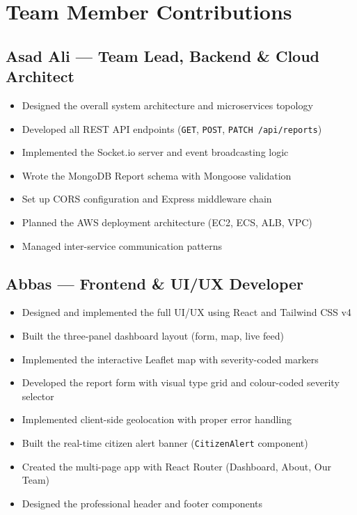 \documentclass[12pt, a4paper]{report}
\begin{document}
\section{Team Member Contributions}

\subsection{Asad Ali --- Team Lead, Backend \& Cloud Architect}

\begin{itemize}
  \item Designed the overall system architecture and microservices topology
  \item Developed all REST API endpoints (\texttt{GET}, \texttt{POST}, \texttt{PATCH /api/reports})
  \item Implemented the Socket.io server and event broadcasting logic
  \item Wrote the MongoDB Report schema with Mongoose validation
  \item Set up CORS configuration and Express middleware chain
  \item Planned the AWS deployment architecture (EC2, ECS, ALB, VPC)
  \item Managed inter-service communication patterns
\end{itemize}

\subsection{Abbas --- Frontend \& UI/UX Developer}

\begin{itemize}
  \item Designed and implemented the full UI/UX using React and Tailwind CSS v4
  \item Built the three-panel dashboard layout (form, map, live feed)
  \item Implemented the interactive Leaflet map with severity-coded markers
  \item Developed the report form with visual type grid and colour-coded severity selector
  \item Implemented client-side geolocation with proper error handling
  \item Built the real-time citizen alert banner (\texttt{CitizenAlert} component)
  \item Created the multi-page app with React Router (Dashboard, About, Our Team)
  \item Designed the professional header and footer components
\end{itemize}
\end{document}
